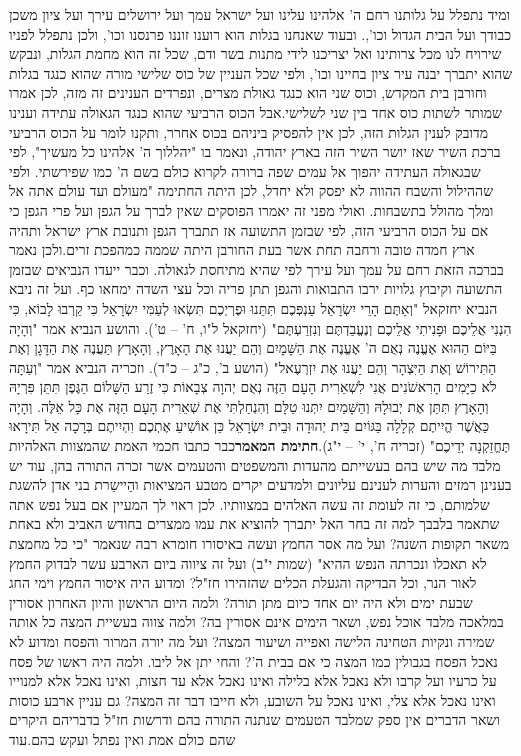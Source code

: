 \documentclass[12pt, openany]{book}
\begin{document}
ומיד נתפלל על גלותנו רחם ה' אלהינו עלינו ועל ישראל עמך ועל ירושלים עירך ועל ציון משכן כבודך ועל הבית הגדול וכו',. ובעוד שאנחנו בגלות הוא רוענו זוננו פרנסנו וכו', ולכן נתפלל לפניו שירויח לנו מכל צרותינו ואל יצריכנו לידי מתנות בשר ודם, שכל זה הוא מחמת הגלות, ונבקש שהוא יתברך יבנה עיר ציון בחיינו וכו', ולפי שכל העניין של כוס שלישי מורה שהוא כנגד בגלות וחורבן בית המקדש, וכוס שני הוא כנגד גאולת מצרים, ונפרדים הענינים זה מזה, לכן אמרו שמותר לשתות כוס אחד בין שני לשלישי.אבל הכוס הרביעי שהוא כנגד הגאולה עתידה וענינו מדובק לענין הגלות הזה, לכן אין להפסיק ביניהם בכוס אחרר, ותקנו לומר על הכוס הרביעי ברכת השיר שאז יושר השיר הזה בארץ יהודה, ונאמר בו "יהללוך ה' אלהינו כל מעשיך", לפי שבגאולה העתידה יהפוך אל עמים שפה ברורה לקרוא כולם בשם ה' כמו שפירשתי. ולפי שההילול והשבח ההווה לא יפסק ולא יחדל, לכן היתה החתימה "מעולם ועד עולם אתה אל ומלך מהולל בתשבחות. ואולי מפני זה יאמרו הפוסקים שאין לברך על הגפן ועל פרי הגפן כי אם על הכוס הרביעי הזה, לפי שבזמן התשועה אז תתברך הגפן ותנובת ארץ ישראל ותהיה ארץ חמדה טובה ורחבה תחת אשר בעת החורבן היתה שממה כמהפכת זרים.ולכן נאמר בברכה הזאת רחם על עמך ועל עירך לפי שהיא מתיחסת לגאולה. וכבר ייעדו הנביאים שבזמן התשועה וקיבוץ גלויות ירבו התבואות והגפן תתן פריה וכל עצי השדה ימחאו כף. ועל זה ניבא הנביא יחזקאל "וְאַתֶּם הָרֵי יִשְׂרָאֵל עַנְפְּכֶם תִּתֵּנוּ וּפֶרְיְכֶם תִּשְׂאוּ לְעַמִּי יִשְׂרָאֵל כִּי קֵרְבוּ לָבוֹא, כִּי הִנְנִי אֲלֵיכֶם וּפָנִיתִי אֲלֵיכֶם וְנֶעֱבַדְתֶּם וְנִזְרַעְתֶּם" (יחזקאל ל"ו, ח' – ט'). והושע הנביא אמר "וְהָיָה בַּיּוֹם הַהוּא אֶעֱנֶה נְאֻם ה' אֶעֱנֶה אֶת הַשָּׁמָיִם וְהֵם יַעֲנוּ אֶת הָאָרֶץ, וְהָאָרֶץ תַּעֲנֶה אֶת הַדָּגָן וְאֶת הַתִּירוֹשׁ וְאֶת הַיִּצְהָר וְהֵם יַעֲנוּ אֶת יִזְרְעֶאל" (הושע ב', כ"ג – כ"ד). וזכריה הנביא אמר "וְעַתָּה לֹא כַיָּמִים הָרִאשֹׁנִים אֲנִי לִשְׁאֵרִית הָעָם הַזֶּה נְאֻם יְהוָה צְבָאוֹת כִּי זֶרַע הַשָּׁלוֹם הַגֶּפֶן תִּתֵּן פִּרְיָהּ וְהָאָרֶץ תִּתֵּן אֶת יְבוּלָהּ וְהַשָּׁמַיִם יִתְּנוּ טַלָּם וְהִנְחַלְתִּי אֶת שְׁאֵרִית הָעָם הַזֶּה אֶת כָּל אֵלֶּה. וְהָיָה כַּאֲשֶׁר הֱיִיתֶם קְלָלָה בַּגּוֹיִם בֵּית יְהוּדָה וּבֵית יִשְׂרָאֵל כֵּן אוֹשִׁיעַ אֶתְכֶם וִהְיִיתֶם בְּרָכָה אַל תִּירָאוּ תֶּחֱזַקְנָה יְדֵיכֶם" (זכריה ח', י' – י"ג).\textrm{\textbf{חתימת המאמר}}כבר כתבו חכמי האמת שהמצוות האלהיות מלבד מה שיש בהם בעשייתם מהעדות והמשפטים והטעמים אשר זכרה התורה בהן, עוד יש בענינן רמזים והערות לענינם עליונים ולמדעים יקרים מטבע המציאות והַיישַרת בני אדן להשגת שלמותם, כי זה לעומת זה עשה האלהים במצוותיו. לכן ראוי לך המעיין אם בעל נפש אתה שתאמר בלבבך למה זה בחר האל יתברך להוציא את עמו ממצרים בחודש האביב ולא באחת משאר תקופות השנה? ועל מה אסר החמץ ועשה באיסורו חומרא רבה שנאמר "כי כל מחמצת לא תאכלו ונכרתה הנפש ההיא" (שמות י"ב) ועל זה ציווה ביום הארבע עשר לבדוק החמץ לאור הנר, וכל הבדיקה והגעלת הכלים שהזהירו חז"ל? ומדוע היה איסור החמץ וימי החג שבעת ימים ולא היה יום אחד כיום מתן תורה? ולמה היום הראשון והיון האחרון אסורין במלאכה מלבד אוכל נפש, ושאר הימים אינם אסורין בה? ולמה צווה בעשיית המצה כל אותה שמירה ונקיות הטחינה הלישה ואפייה  ושיעור המצה? ועל מה יורה המרור והפסח ומדוע לא נאכל הפסח בגבולין כמו המצה כי אם בבית ה'? והחי יתן אל ליבו. ולמה היה ראשו של פסח על כרעיו ועל קרבו ולא נאכל אלא בלילה ואינו נאכל אלא עד חצות, ואינו נאכל אלא למנוייו ואינו נאכל אלא צלי, ואינו נאכל על השובע, ולא חייבו דבר זה המצה? גם עניין ארבע כוסות ושאר הדברים אין ספק שמלבד הטעמים שנתנה התורה בהם ודרשות חז"ל בדבריהם היקרים שהם כולם אמת ואין נפתל ועקש בהם.עוד 
\end{document}
